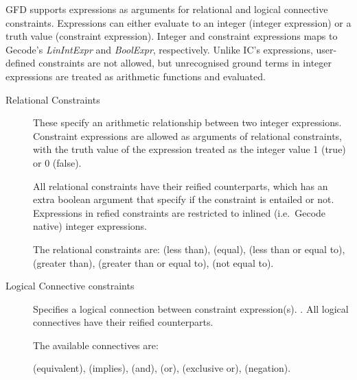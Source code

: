 GFD supports expressions as arguments for relational and logical connective
constraints. Expressions can either evaluate to an integer (integer 
expression) or a truth value (constraint expression). Integer and 
constraint expressions maps to Gecode's {\it LinIntExpr\/} and {\it BoolExpr}, 
respectively. Unlike IC's expressions, user-defined constraints are not
allowed, but unrecognised ground terms in integer expressions are treated as
arithmetic functions and evaluated.

\begin{description}
\item[Relational Constraints]
These specify an arithmetic relationship between two integer expressions.
Constraint expressions are allowed as arguments of relational constraints,
with the truth value of the expression treated as the integer value 1 (true)
or 0 (false). 

All relational constraints have their reified counterparts, which has an extra
boolean argument that specify if the constraint is entailed or not. Expressions
in refied constraints are restricted to inlined (i.e.\ Gecode native) integer
expressions.

The  relational constraints are:
 (less than),
 (equal), 
 (less than or equal to),
 (greater than),
 (greater than or equal to),
 (not equal to).

\item[Logical Connective constraints]
Specifies a logical connection between constraint expression(s). 
. 
All logical connectives have their reified counterparts.

The available connectives are:

 (equivalent),
 (implies),
 (and),
 (or),
 (exclusive or),
 (negation).


\end{description}
